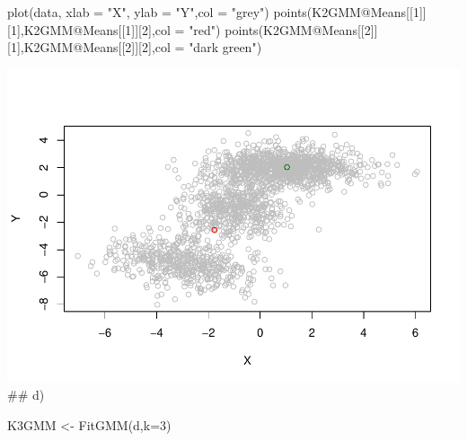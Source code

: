\documentclass[
]{article}
\newenvironment{Shaded}{\begin{snugshade}}{\end{snugshade}}
\newcommand{\AttributeTok}[1]{\textcolor[rgb]{0.77,0.63,0.00}{#1}}
\newcommand{\DecValTok}[1]{\textcolor[rgb]{0.00,0.00,0.81}{#1}}
\newcommand{\FunctionTok}[1]{\textcolor[rgb]{0.00,0.00,0.00}{#1}}
\newcommand{\NormalTok}[1]{#1}
\newcommand{\OtherTok}[1]{\textcolor[rgb]{0.56,0.35,0.01}{#1}}
\newcommand{\SpecialCharTok}[1]{\textcolor[rgb]{0.00,0.00,0.00}{#1}}
\newcommand{\StringTok}[1]{\textcolor[rgb]{0.31,0.60,0.02}{#1}}
\begin{document}
\begin{Shaded}
\begin{Highlighting}[]
\FunctionTok{plot}\NormalTok{(data, }\AttributeTok{xlab =} \StringTok{"X"}\NormalTok{, }\AttributeTok{ylab =} \StringTok{"Y"}\NormalTok{,}\AttributeTok{col =} \StringTok{"grey"}\NormalTok{)}
\FunctionTok{points}\NormalTok{(K2GMM}\SpecialCharTok{@}\NormalTok{Means[[}\DecValTok{1}\NormalTok{]][}\DecValTok{1}\NormalTok{],K2GMM}\SpecialCharTok{@}\NormalTok{Means[[}\DecValTok{1}\NormalTok{]][}\DecValTok{2}\NormalTok{],}\AttributeTok{col =} \StringTok{"red"}\NormalTok{)}
\FunctionTok{points}\NormalTok{(K2GMM}\SpecialCharTok{@}\NormalTok{Means[[}\DecValTok{2}\NormalTok{]][}\DecValTok{1}\NormalTok{],K2GMM}\SpecialCharTok{@}\NormalTok{Means[[}\DecValTok{2}\NormalTok{]][}\DecValTok{2}\NormalTok{],}\AttributeTok{col =} \StringTok{"dark green"}\NormalTok{)}
\end{Highlighting}
\end{Shaded}

\includegraphics{539-hw3_files/figure-latex/unnamed-chunk-10-1.pdf} \#\#
d)

\begin{Shaded}
\begin{Highlighting}[]
\NormalTok{K3GMM }\OtherTok{\textless{}{-}} \FunctionTok{FitGMM}\NormalTok{(d,}\AttributeTok{k=}\DecValTok{3}\NormalTok{)}
\end{Highlighting}
\end{Shaded}
\end{document}
